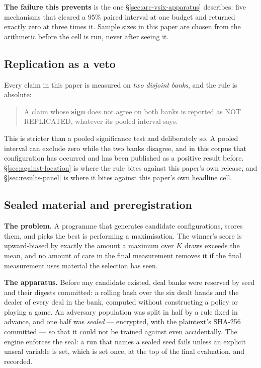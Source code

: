 \textbf{The failure this prevents} is the one \S\ref{sec:arc-vsix-apparatus} describes: five
mechanisms that cleared a 95\% paired interval at one budget and returned exactly zero at three
times it. Sample sizes in this paper are chosen from the arithmetic before the cell is run, never
after seeing it.

\subsection{Replication as a veto}
\label{sec:methodology-replication}

Every claim in this paper is measured on \emph{two disjoint banks}, and the rule is absolute:

\begin{quote}
A claim whose \textbf{sign} does not agree on both banks is reported as NOT REPLICATED, whatever its
pooled interval says.
\end{quote}

This is stricter than a pooled significance test and deliberately so. A pooled interval can exclude
zero while the two banks disagree, and in this corpus that configuration has occurred and has been
published as a positive result before. \S\ref{sec:against-location} is where the rule bites against
this paper's own release, and \S\ref{sec:results-panel} is where it bites against this paper's own
headline cell.

\subsection{Sealed material and preregistration}
\label{sec:methodology-seal}

\textbf{The problem.} A programme that generates candidate configurations, scores them, and picks
the best is performing a maximisation. The winner's score is upward-biased by exactly the amount a
maximum over $K$ draws exceeds the mean, and no amount of care in the final measurement removes it
if the final measurement uses material the selection has seen.

\textbf{The apparatus.} Before any candidate existed, deal banks were reserved by seed and their
digests committed: a rolling hash over the six dealt hands and the dealer of every deal in the bank,
computed without constructing a policy or playing a game. An adversary population was split in half
by a rule fixed in advance, and one half was \emph{sealed} --- encrypted, with the plaintext's
SHA-256 committed --- so that it could not be trained against even accidentally. The engine enforces
the seal: a run that names a sealed seed fails unless an explicit unseal variable is set, which is
set once, at the top of the final evaluation, and recorded.

